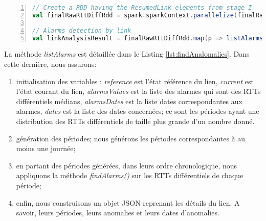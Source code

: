 \begin{lstlisting}[language=scala,firstnumber=1, caption={Détection des alarmes des liens},label={lst:paralelizeAndDtectAnomalies}, basicstyle = \footnotesize,escapechar=|,numbers=left,
stepnumber=1]
// Create a RDD having the ResumedLink elements from stage I
val finalRawRttDiffRdd = spark.sparkContext.parallelize(finalRawRttDiff.toSeq) |\label{parallelizefinalRawRttDiff}|

// Alarms detection by link
val linkAnalysisResult = finalRawRttDiffRdd.map(p => listAlarms(spark, p, timewindow, rangeDates))
\end{lstlisting}

La méthode \textit{listAlarms} est détaillée dans le Listing \ref{lst:findAnalomalies}. Dans cette dernière, nous assurons:


\begin{enumerate}
	\item initialisation des variables : \textit{reference} est l'état référence du lien, \textit{current} est l'état courant du lien, \textit{alarmsValues} est la liste des alarmes qui sont des RTTs différentiels médians, \textit{alarmsDates} est la liste dates correspondantes aux alarmes, \textit{dates} est la liste des dates concernées; ce sont les périodes ayant une distribution des RTTs différentiels de taille plus grande d'un nombre donné.
	\item  génération des périodes; nous générons les périodes correspondantes à au moins une journée;
    \item  en partant des périodes générées, dans leurs ordre chronologique, nous appliquons la méthode \textit{findAlarms()} sur les RTTs différentiels de chaque période;
    \item enfin, nous construisons un objet JSON reprenant les détails du lien. A savoir, leurs périodes, leurs anomalies et leurs dates d'anomalies. 
\end{enumerate}

